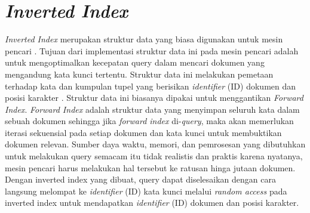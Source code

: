 \section{\textit{Inverted Index}}

\textit{Inverted Index} merupakan struktur data yang biasa digunakan untuk mesin pencari \parencite{invertedindex2}. Tujuan dari implementasi struktur data ini pada mesin pencari adalah untuk mengoptimalkan kecepatan query dalam mencari dokumen yang mengandung kata kunci tertentu. Struktur data ini melakukan pemetaan terhadap kata dan kumpulan tupel yang berisikan \textit{identifier} (ID) dokumen dan posisi karakter \parencite{invertedindex}. Struktur data ini biasanya dipakai untuk menggantikan \textit{Forward Index}. \textit{Forward Index} adalah struktur data yang menyimpan seluruh kata dalam sebuah dokumen sehingga jika \textit{forward index} di-\textit{query}, maka akan memerlukan iterasi sekuensial pada setiap dokumen dan kata kunci untuk membuktikan dokumen relevan. Sumber daya waktu, memori, dan pemrosesan yang dibutuhkan untuk melakukan query semacam itu tidak realistis dan praktis karena nyatanya, mesin pencari harus melakukan hal tersebut ke ratusan hinga jutaan dokumen. Dengan inverted index yang dibuat, query dapat diselesaikan dengan cara langsung melompat ke \textit{identifier} (ID) kata kunci melalui \textit{random access} pada inverted index untuk mendapatkan \textit{identifier} (ID) dokumen dan posisi karakter.